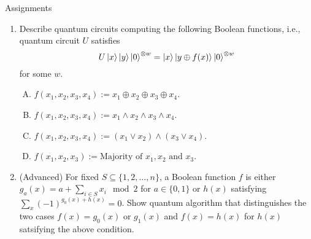 \documentclass{beamer}
\begin{document}
\begin{frame}{Assignments}
\begin{enumerate}
\setlength{\itemsep}{2em}
\item Describe quantum circuits computing the following Boolean functions, i.e., quantum circuit $U$ satisfies
\begin{equation*}
U\ket{x}\ket{y}\ket{0}^{\otimes w} = \ket{x}\ket{y\oplus f(x)}\ket{0}^{\otimes w}
\end{equation*}
for some $w$.
\begin{enumerate}[(A)]
\item $f(x_1,x_2,x_3,x_4):= x_1\oplus x_2\oplus x_3\oplus x_4$.
\item $f(x_1,x_2,x_3,x_4):= x_1\wedge x_2\wedge x_3\wedge x_4$.
\item $f(x_1,x_2,x_3,x_4):= (x_1\vee x_2)\wedge (x_3\vee x_4)$.
\item $f(x_1,x_2,x_3):= \text{Majority of } x_1, x_2 \text{ and } x_3$.
\end{enumerate}
\item (Advanced) For fixed $S\subseteq \{1,2,\dotsc,n\}$, a Boolean function $f$ is either $g_a(x)=a+\sum_{i\in S} x_i \mod 2$ for $a\in\{0,1\}$ or $h(x)$ satisfying $\sum_{x} (-1)^{g_0(x)+h(x)} = 0$.
Show quantum algorithm that distinguishes the two cases $f(x)=g_0(x) \text{ or } g_1(x)$ and $f(x)=h(x)$ for $h(x)$ satsifying the above condition.
\end{enumerate}
\end{frame}
\end{document}
